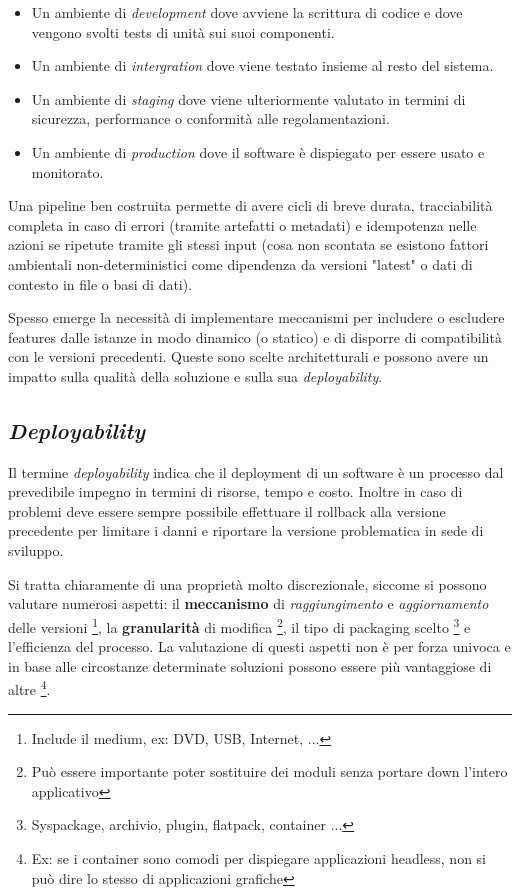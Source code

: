 \documentclass[a4paper,11pt,oneside, table]{article}
\begin{document}
  \begin{itemize}
    \item Un ambiente di \textit{development} dove avviene la scrittura di codice e dove vengono svolti tests di unit\`a sui suoi componenti.
    \item Un ambiente di \textit{intergration} dove viene testato insieme al resto del sistema.
    \item Un ambiente di \textit{staging} dove viene ulteriormente valutato in termini di sicurezza, performance o conformit\`a alle regolamentazioni.
    \item Un ambiente di \textit{production} dove il software \`e dispiegato per essere usato e monitorato.
  \end{itemize}

  Una pipeline ben costruita permette di avere cicli di breve durata, tracciabilit\`a completa in caso di errori (tramite artefatti o metadati) e idempotenza nelle azioni se ripetute tramite gli stessi input (cosa non scontata se esistono fattori ambientali non-deterministici come dipendenza da versioni "latest" o dati di contesto in file o basi di dati).

  Spesso emerge la necessit\`a di implementare meccanismi per includere o escludere features dalle istanze in modo dinamico (o statico) e di disporre di compatibilit\`a con le versioni precedenti. Queste sono scelte architetturali e possono avere un impatto sulla qualit\`a della soluzione e sulla sua \textit{deployability}.

  \subsection{\textit{Deployability}}

  Il termine \textit{deployability} indica che il deployment di un software \`e un processo dal prevedibile impegno in termini di risorse, tempo e costo. Inoltre in caso di problemi deve essere sempre possibile effettuare il rollback alla versione precedente per limitare i danni e riportare la versione problematica in sede di sviluppo.

  Si tratta chiaramente di una propriet\`a molto discrezionale, siccome si possono valutare numerosi aspetti: il \textbf{meccanismo} di \textit{raggiungimento} e \textit{aggiornamento} delle versioni \footnote{Include il medium, ex: DVD, USB, Internet, ...}, la \textbf{granularit\`a} di modifica \footnote{Pu\`o essere importante poter sostituire dei moduli senza portare down l'intero applicativo}, il tipo di packaging scelto \footnote{Syspackage, archivio, plugin, flatpack, container ...} e l'efficienza del processo. La valutazione di questi aspetti non \`e per forza univoca e in base alle circostanze determinate soluzioni possono essere pi\`u vantaggiose di altre \footnote{Ex: se i container sono comodi per dispiegare applicazioni headless, non si pu\`o dire lo stesso di applicazioni grafiche}.
\end{document}
